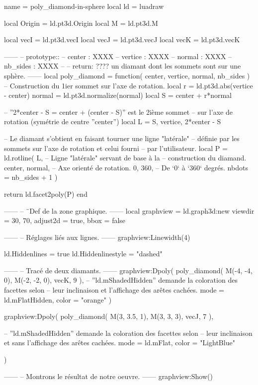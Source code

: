 \documentclass[border = 3pt]{standalone}
\begin{document}
\begin{luadraw*}{name = poly_diamond-in-sphere}
local ld = luadraw

local Origin = ld.pt3d.Origin
local M      = ld.pt3d.M

local vecI = ld.pt3d.vecI
local vecJ = ld.pt3d.vecJ
local vecK = ld.pt3d.vecK

------
-- prototype::
--     center   : XXXX
--     vertice  : XXXX
--     normal   : XXXX
--     nb_sides : XXXX
--
--     return: ???? un diamant dont les sommets sont sur une sphère.
------
local poly_diamond = function(
  center,
  vertice,
  normal,
  nb_sides
)
-- Construction du 1ier sommet sur l'axe de rotation.
  local r = ld.pt3d.abs(vertice - center)
  normal  = ld.pt3d.normalize(normal)
  local S = center + r*normal

-- ''2*center - S = center + (center - S)'' est le 2ième sommet
-- sur l'axe de rotation (symétrie de centre ''center'')
  local L = {S, vertice, 2*center - S}

-- Le diamant s'obtient en faisant tourner une ligne "latérale"
-- définie par les sommets sur l'axe de rotation et celui fourni
-- par l'utilisateur.
  local P = ld.rotline(
    L,                 -- Ligne "latérale" servant de base à la
                       -- construction du diamand.
    {center, normal},  -- Axe orienté de rotation.
    0, 360,            -- De `0` à `360` degrés.
    {nbdots = nb_sides + 1}
  )

  return ld.facet2poly(P)
end

------
-- ¨Def de la zone graphique.
------
local graphview = ld.graph3d:new{
  viewdir  = {30, 70},
  adjust2d = true,
  bbox     = false
}

------
-- Réglages liés aux lignes.
------
graphview:Linewidth(4)

ld.Hiddenlines     = true
ld.Hiddenlinestyle = "dashed"

------
-- Tracé de deux diamants.
------
graphview:Dpoly(
  poly_diamond(
    M(-4, -4, 0),
    M(-2, -2, 0),
    vecK,
    9
  ),
  {
-- ''ld.mShadedHidden'' demande la coloration des facettes selon
-- leur inclinaison et l'affichage des arêtes cachées.
    mode  = ld.mFlatHidden,
    color = "orange"
  }
)

graphview:Dpoly(
  poly_diamond(
    M(3, 3.5, 1),
    M(3, 3, 3),
    vecJ,
    7
  ),
  {

-- ''ld.mShadedHidden'' demande la coloration des facettes selon
-- leur inclinaison et sans l'affichage des arêtes cachées.
    mode  = ld.mFlat,
    color = "LightBlue"
  }
)

------
-- Montrons le résultat de notre oeuvre.
------
graphview:Show()
\end{luadraw*}
\end{document}

